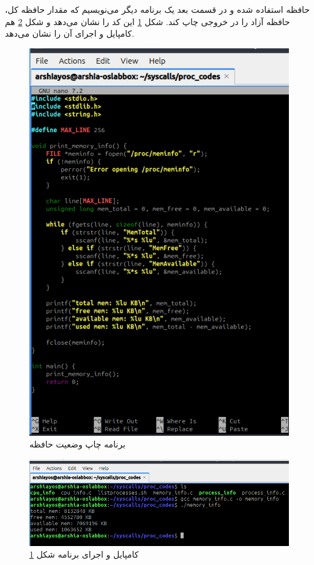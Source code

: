\documentclass[12pt]{article}
\begin{document}
	در قسمت بعد یک برنامه دیگر می‌نویسیم که ‫مقدار‬ ‫حافظه‬ ‫کل‪،‬‬ ‫حافظه‬ ‫استفاده‬ ‫شده‬ ‫و‬ ‫حافظه‬ ‫آزاد‬ ‫را‬ ‫در‬ ‫خروجی‬ ‫چاپ‬ ‫کند‬. شکل \ref{fig:26} این کد را نشان می‌دهد و شکل \ref{fig:27} هم کامپایل و اجرای آن را نشان می‌دهد.
	\begin{figure}[H]
		\centering
		\includegraphics[width=\textwidth]{report3-resources/24.png}
		\caption{برنامه چاپ وضعیت حافظه}
		\label{fig:26}
	\end{figure}
	\begin{figure}[H]
		\centering
		\includegraphics[width=\textwidth]{report3-resources/25.png}
		\caption{کامپایل و اجرای برنامه شکل \ref{fig:26}}
		\label{fig:27}
	\end{figure}
	
\end{document}
